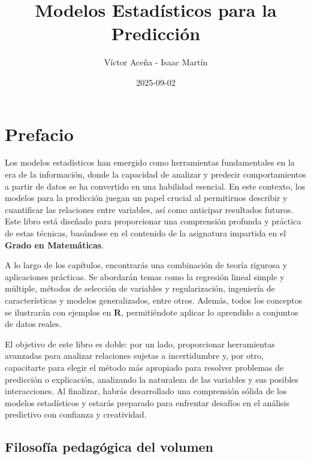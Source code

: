 \documentclass[
  letterpaper,
  DIV=11,
  numbers=noendperiod]{scrreprt}
\title{Modelos Estadísticos para la Predicción}
\author{Víctor Aceña - Isaac Martín}
\date{2025-09-02}
\renewcommand*\contentsname{Table of contents}
\newcommand\contentsname{Table of contents}
\begin{document}
\maketitle

\renewcommand*\contentsname{Table of contents}
{
\hypersetup{linkcolor=}
\setcounter{tocdepth}{2}
\tableofcontents
}


\chapter*{Prefacio}\label{prefacio}


Los modelos estadísticos han emergido como herramientas fundamentales en
la era de la información, donde la capacidad de analizar y predecir
comportamientos a partir de datos se ha convertido en una habilidad
esencial. En este contexto, los modelos para la predicción juegan un
papel crucial al permitirnos describir y cuantificar las relaciones
entre variables, así como anticipar resultados futuros. Este libro está
diseñado para proporcionar una comprensión profunda y práctica de estas
técnicas, basándose en el contenido de la asignatura impartida en el
\textbf{Grado en Matemáticas}.

A lo largo de los capítulos, encontrarás una combinación de teoría
rigurosa y aplicaciones prácticas. Se abordarán temas como la regresión
lineal simple y múltiple, métodos de selección de variables y
regularización, ingeniería de características y modelos generalizados,
entre otros. Además, todos los conceptos se ilustrarán con ejemplos en
\textbf{R}, permitiéndote aplicar lo aprendido a conjuntos de datos
reales.

El objetivo de este libro es doble: por un lado, proporcionar
herramientas avanzadas para analizar relaciones sujetas a incertidumbre
y, por otro, capacitarte para elegir el método más apropiado para
resolver problemas de predicción o explicación, analizando la naturaleza
de las variables y sus posibles interacciones. Al finalizar, habrás
desarrollado una comprensión sólida de los modelos estadísticos y
estarás preparado para enfrentar desafíos en el análisis predictivo con
confianza y creatividad.

\section*{Filosofía pedagógica del
volumen}\label{filosofuxeda-pedaguxf3gica-del-volumen}
\end{document}
